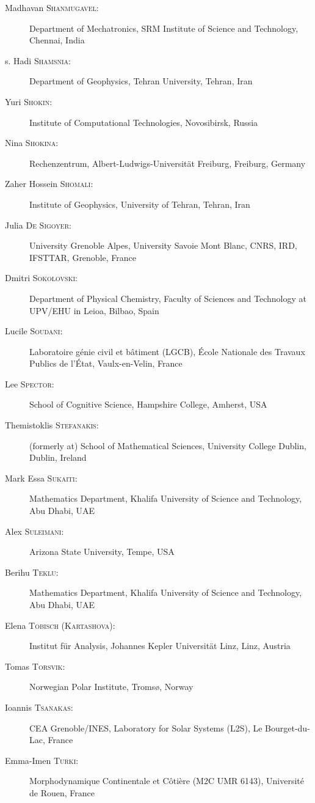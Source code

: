 \begin{description}
  \item[Madhavan \textsc{Shanmugavel}:] Department of Mechatronics, SRM Institute of Science and Technology, Chennai, India
  \item[s. Hadi \textsc{Shamsnia}:] Department of Geophysics, Tehran University, Tehran, Iran
  \item[Yuri \textsc{Shokin}:] Institute of Computational Technologies, Novosibirsk, Russia
  \item[Nina \textsc{Shokina}:] Rechenzentrum, Albert-Ludwigs-Universit\"at Freiburg, Freiburg, Germany
  \item[Zaher Hossein \textsc{Shomali}:] Institute of Geophysics, University of Tehran, Tehran, Iran
  \item[Julia \textsc{De Sigoyer}:] University Grenoble Alpes, University Savoie Mont Blanc, CNRS, IRD, IFSTTAR, Grenoble, France
  \item[Dmitri \textsc{Sokolovski}:] Department of Physical Chemistry, Faculty of Sciences and Technology at UPV/EHU in Leioa, Bilbao, Spain
  \item[Lucile \textsc{Soudani}:] Laboratoire g\'enie civil et b\^atiment (LGCB), \'Ecole Nationale des Travaux Publics de l'\'Etat, Vaulx-en-Velin, France
  \item[Lee \textsc{Spector}:] School of Cognitive Science, Hampshire College, Amherst, USA
  \item[Themistoklis \textsc{Stefanakis}:] (formerly at) School of Mathematical Sciences, University College Dublin, Dublin, Ireland
  \item[Mark Essa \textsc{Sukaiti}:] Mathematics Department, Khalifa University of Science and Technology, Abu Dhabi, UAE
  \item[Alex \textsc{Suleimani}:] Arizona State University, Tempe, USA
  \item[Berihu \textsc{Teklu}:] Mathematics Department, Khalifa University of Science and Technology, Abu Dhabi, UAE
  \item[Elena \textsc{Tobisch} (\textsc{Kartashova}):] Institut f\"ur Analysis, Johannes Kepler Universit\"at Linz, Linz, Austria
  \item[Tomas \textsc{Torsvik}:] Norwegian Polar Institute, Troms\o, Norway
  \item[Ioannis \textsc{Tsanakas}:] CEA Grenoble/INES, Laboratory for Solar Systems (L2S), Le Bourget-du-Lac, France
  \item[Emma-Imen \textsc{Turki}:] Morphodynamique Continentale et C\^oti\`ere (M2C UMR 6143), Universit\'e de Rouen, France

\end{description}
